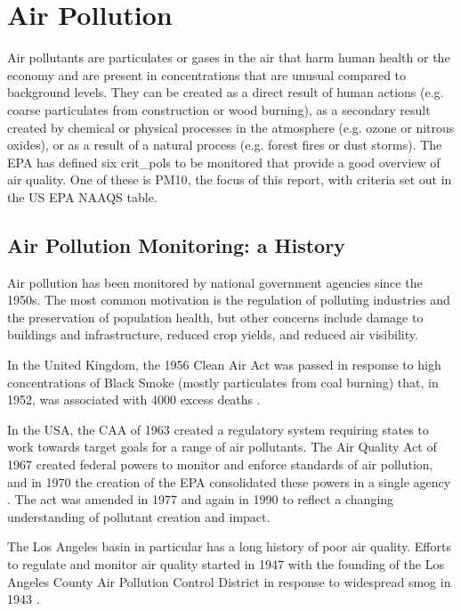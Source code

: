 \section{Air Pollution}\label{sec:introdairpollution}
Air pollutants are particulates or gases in the air that harm human health or the economy and are present in concentrations that are unusual compared to background levels.  They can be created as a direct result of human actions (e.g. coarse particulates from construction or wood burning), as a secondary result created by chemical or physical processes in the atmosphere (e.g. ozone or nitrous oxides), or as a result of a natural process (e.g. forest fires or dust storms).  The \ac{EPA} has defined six \glspl{crit_pol} to be monitored that provide a good overview of air quality.  One of these is \ac{PM10}, the focus of this report,  with criteria set out in the US EPA NAAQS table.

\subsection{Air Pollution Monitoring: a History}
\label{sec:apmonitoring}
Air pollution has been monitored by national government agencies since the 1950s.  The most common motivation is the regulation of polluting industries and the preservation of population health, but other concerns include damage to buildings and infrastructure, reduced crop yields, and reduced air visibility.  

In the United Kingdom, the 1956 Clean Air Act was passed in response to high concentrations of Black Smoke (mostly particulates from coal burning) that, in 1952, was associated with 4000 excess deaths \cite{shaddick2014case}.

In the USA, the \ac{CAA} of 1963 created a regulatory system requiring states to work towards target goals for a range of air pollutants.  The Air Quality Act of 1967 created federal powers to monitor and enforce standards of air pollution, and in 1970 the creation of the \ac{EPA} consolidated these powers in a single agency %
.  The act was amended in 1977 and again in 1990 to reflect a changing understanding of pollutant creation and impact.  

The Los Angeles basin in particular has a long history of poor air quality.  Efforts to regulate and monitor air quality started in 1947 with the founding of the Los Angeles County Air Pollution Control District in response to widespread smog in 1943 
.



